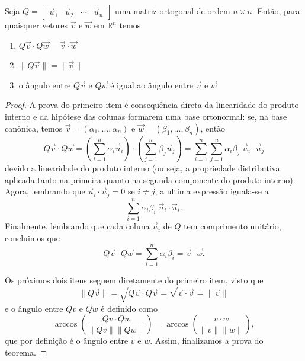 \begin{teo}
	Seja $Q= \begin{bmatrix}
	\vec{u}_1 & \vec{u}_2 & \cdots & \vec{u}_n
	\end{bmatrix}$ uma matriz ortogonal de ordem $n \times n$. Então, para quaisquer vetores $\vec{v}$ e $\vec{w}$ em $\mathbb{R}^n$ temos
	\begin{enumerate}[$(i)$]
		\item $Q\vec{v} \cdot Q\vec{w} = \vec{v} \cdot  \vec{w}$
		\item  $\| Q\vec{v} \| = \| \vec{v} \|$
		\item  o ângulo entre $Q\vec{v}$ e $Q\vec{w}$ é igual ao  ângulo entre $\vec{v}$ e $\vec{w}$
		\end{enumerate}
\end{teo}

\begin{proof}
A prova do primeiro item é consequência direta da linearidade do produto interno e da hipótese das colunas formarem uma base ortonormal: se, na base canônica, temos $\vec{v} = (\alpha_1,..., \alpha_n)$ e $\vec{w} = (\beta_1, ..., \beta_n)$, então
\begin{equation}Q\vec{v} \cdot Q\vec{w} = \left( \sum_{i=1}^n \alpha_i \vec{u}_i \right) \cdot \left(   \sum_{j=1}^n \beta_j \vec{u}_j \right) =  \sum_{i=1}^n \sum_{j=1}^n \alpha_i \beta_j \;\vec{u}_i \cdot \vec{u}_j\end{equation}
devido a linearidade do produto interno (ou seja, a propriedade distributiva aplicada tanto na primeira quanto na segunda componente do produto interno). Agora, lembrando que $\vec{u}_i \cdot \vec{u}_j=0$ se $i \neq j$, a ultima expressão iguala-se a
\begin{equation} \sum_{i=1}^n \alpha_i \beta_i \; \vec{u}_i \cdot \vec{u}_i.\end{equation}
Finalmente, lembrando que cada coluna $\vec{u}_i$ de $Q$ tem comprimento unitário, concluimos que
\begin{equation}Q\vec{v} \cdot Q\vec{w} = \sum_{i=1}^n \alpha_i \beta_i = \vec{v} \cdot \vec{w}.\end{equation}


 Os próximos dois itens seguem diretamente do primeiro item, visto que
\begin{equation}\| Q \vec{v} \| = \sqrt{Q\vec{v} \cdot Q\vec{v}} = \sqrt{\vec{v} \cdot \vec{v}} =  \| \vec{v} \| \end{equation}
e
o ângulo entre $Qv$ e $Qw$ é definido como
\begin{equation}
\arccos\left(\frac{Qv \cdot Qw	}{\|Qv\| \|Qw\|} \right)
=\arccos\left(\frac{v \cdot w	}{\|v\| \|w\|} \right),\end{equation}
que por definição é o ângulo  entre $v$ e $w$.
Assim, finalizamos a prova do teorema.
\end{proof}


